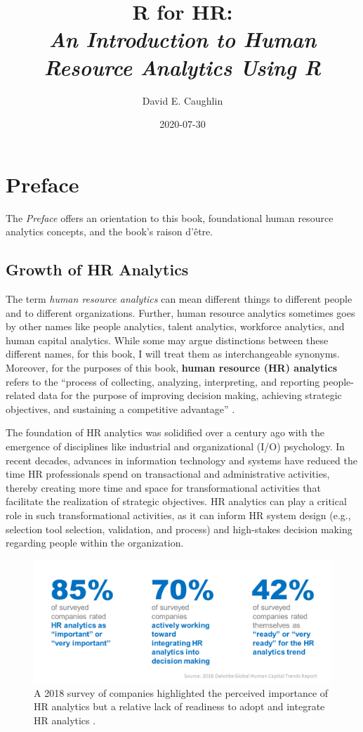 \documentclass[]{book}
\title{R for HR:\\
\emph{An Introduction to Human Resource Analytics Using R}}
\author{David E. Caughlin}
\date{2020-07-30}
\begin{document}
\maketitle

{
\setcounter{tocdepth}{1}
\tableofcontents
}
\chapter*{Preface}\label{preface}

The \emph{Preface} offers an orientation to this book, foundational
human resource analytics concepts, and the book's raison d'être.

\section{Growth of HR Analytics}\label{hragrowth}

The term \emph{human resource analytics} can mean different things to
different people and to different organizations. Further, human resource
analytics sometimes goes by other names like people analytics, talent
analytics, workforce analytics, and human capital analytics. While some
may argue distinctions between these different names, for this book, I
will treat them as interchangeable synonyms. Moreover, for the purposes
of this book, \textbf{human resource (HR) analytics} refers to the
``process of collecting, analyzing, interpreting, and reporting
people-related data for the purpose of improving decision making,
achieving strategic objectives, and sustaining a competitive advantage''
\citep[p.~34]{baueretal2020}.

The foundation of HR analytics was solidified over a century ago with
the emergence of disciplines like industrial and organizational (I/O)
psychology. In recent decades, advances in information technology and
systems have reduced the time HR professionals spend on transactional
and administrative activities, thereby creating more time and space for
transformational activities that facilitate the realization of strategic
objectives. HR analytics can play a critical role in such
transformational activities, as it can inform HR system design (e.g.,
selection tool selection, validation, and process) and high-stakes
decision making regarding people within the organization.

\begin{figure}
\centering
\includegraphics{deloittetrends.png}
\caption{A 2018 survey of companies highlighted the perceived importance
of HR analytics but a relative lack of readiness to adopt and integrate
HR analytics \citep{deloitte2018}.}
\end{figure}
\end{document}
